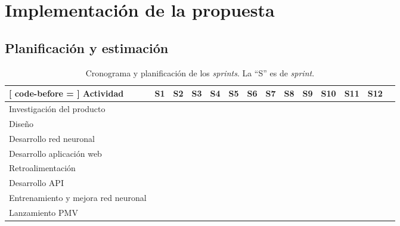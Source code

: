 \section{Implementación de la propuesta}

\subsection{Planificación y estimación}

\begin{table}
	\small\centering
    \caption{Cronograma y planificación de los \textit{sprints}. La ``S'' es de \textit{sprint}.}
    \label{tab:sprints}
    \begin{NiceTabular}{p{4.5cm}|c|c|c|c|c|c|c|c|c|c|c|c|c}[
        code-before = 
     ]
        \hline
        Actividad                  & S1& S2& S3& S4& S5& S6& S7& S8& S9&S10&S11&S12\\
        \hline
        Investigación del producto &   &   &   &   &   &   &   &   &   &   &   &   \\
        \hline
        Diseño                     &   &   &   &   &   &   &   &   &   &   &   &   \\
        \hline
        Desarrollo red neuronal    &   &   &   &   &   &   &   &   &   &   &   &   \\
        \hline
        Desarrollo aplicación web  &   &   &   &   &   &   &   &   &   &   &   &   \\
        \hline
        Retroalimentación          &   &   &   &   &   &   &   &   &   &   &   &   \\
        \hline
        Desarrollo 
        API             &   &   &   &   &   &   &   &   &   &   &   &   \\
        \hline
        Entrenamiento y mejora red neuronal &   &   &   &   &   &   &   &   &   &   &   \\
        \hline
        Lanzamiento PMV            &   &   &   &   &   &   &   &   &   &   &   &   \\
        \hline      
    \end{NiceTabular}
\end{table}



